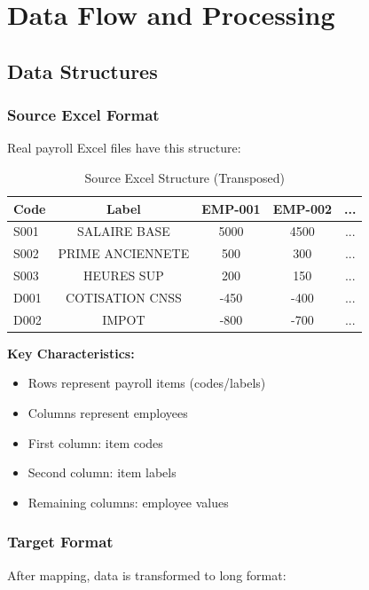 \chapter{Data Flow and Processing}

\section{Data Structures}

\subsection{Source Excel Format}

Real payroll Excel files have this structure:

\begin{table}[H]
\centering
\small
\begin{tabular}{|l|c|c|c|c|}
\hline
\textbf{Code} & \textbf{Label} & \textbf{EMP-001} & \textbf{EMP-002} & ... \\
\hline
S001 & SALAIRE BASE & 5000 & 4500 & ... \\
S002 & PRIME ANCIENNETE & 500 & 300 & ... \\
S003 & HEURES SUP & 200 & 150 & ... \\
D001 & COTISATION CNSS & -450 & -400 & ... \\
D002 & IMPOT & -800 & -700 & ... \\
\hline
\end{tabular}
\caption{Source Excel Structure (Transposed)}
\end{table}

\textbf{Key Characteristics:}
\begin{itemize}
    \item Rows represent payroll items (codes/labels)
    \item Columns represent employees
    \item First column: item codes
    \item Second column: item labels
    \item Remaining columns: employee values
\end{itemize}

\subsection{Target Format}

After mapping, data is transformed to long format:

